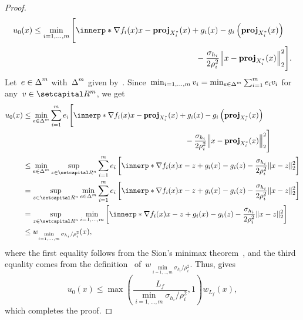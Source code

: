\documentclass[../main]{subfiles}
\begin{document}
\begin{proof}
\begin{equation}
        u_0(x) \le \min_{i = 1, \dots, m}
            \begin{multlined}[t]
                \Biggl[ \innerp*{\nabla f_i(x)}{x - \proj_{X_i^*}(x)} + g_i(x) - g_i\left( \proj_{X_i^*}(x) \right) \\
                    - \frac{\sigma_{h_i}}{2 \rho_i^2} \norm*{x - \proj_{X_i^*}(x)}_2^2 \Biggr]
            .\end{multlined}
    \end{equation}
    Let~$e \in \operatorname{\Delta}^m$ with~$\operatorname{\Delta}^m$ given by~.
    Since~$\min_{i = 1, \dots, m} v_i = \min_{e \in \operatorname{\Delta}^m} \sum_{i = 1}^{m} e_i v_i$ for any~$v \in \setR^m$, we get
    \begin{align}
        u_0(x) &\le \min_{e \in \simplex^m} \sum_{i = 1}^{m} e_i
            \begin{multlined}[t]
                \Biggl[ \innerp*{\nabla f_i(x)}{x - \proj_{X_i^*}(x)} + g_i(x) - g_i\left( \proj_{X_i^*}(x) \right) \\
                    - \frac{\sigma_{h_i}}{2 \rho_i^2} \norm*{x - \proj_{X_i^*}(x)}_2^2 \Biggr]
            \end{multlined} \\
        &\le \min_{e \in \simplex^m} \sup_{z \in \setR^n} \sum_{i = 1}^{m} e_i \left[ \innerp*{\nabla f_i(x)}{x - z} + g_i(x) - g_i(z) - \frac{\sigma_{h_i}}{2 \rho_i^2} \norm{x - z}_2^2 \right] \\
        &= \sup_{z \in \setR^n} \min_{e \in \simplex^m} \sum_{i = 1}^{m} e_i \left[ \innerp*{\nabla f_i(x)}{x - z} + g_i(x) - g_i(z) - \frac{\sigma_{h_i}}{2 \rho_i^2} \norm{x - z}_2^2 \right] \\
        &= \sup_{z \in \setR^n} \min_{i = 1, \dots, m} \left[ \innerp*{\nabla f_i(x)}{x - z} + g_i(x) - g_i(z) - \frac{\sigma_{h_i}}{2 \rho_i^2} \norm{x - z}_2^2 \right] \\
        &\le w_{\min\limits_{i = 1, \dots, m} \sigma_{h_i} / \rho_i^2}(x)
    ,\end{align}
    where the first equality follows from the Sion's minimax theorem~\cite{Sion1958}, and the third equality comes from the definition~ of~$w_{\min\limits_{i = 1, \dots, m} \sigma_{h_i} / \rho_i^2}$.
    Thus,  gives
    \begin{equation}
        u_0(x) \le \max \left( \frac{L_f}{\min\limits_{i = 1, \dots, m} \sigma_{h_i} / \rho_i^2} , 1 \right) w_{L_f}(x)
    ,\end{equation}
    which completes the proof.
\end{proof}
\end{document}
